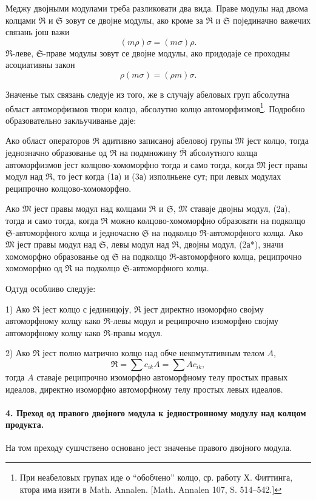 ﻿\documentclass[11pt]{article}
\providecommand{\frM}{\mathfrak M}
\providecommand{\frR}{\mathfrak R}
\providecommand{\frS}{\mathfrak S}
\providecommand{\glqq}{``}
\providecommand{\grqq}{''}
\begin{document}
Меджу двојными модулами треба разликовати два вида. Праве модулы над двома колцами \(\frR\) и \(\frS\) зовут се двојне модулы, ако кроме за \(\frR\) и \(\frS\) појединачно важечих связань још важи
\[
        (m\rho)\sigma=(m\sigma)\rho .
\]
\(\frR\)-леве, \(\frS\)-праве модулы зовут се двојне модулы, ако придодаје се проходны асоциативны закон
\[
        \rho(m\sigma)=(\rho m)\sigma .
\]

Значенье тых связань следује из того, же в случају абеловых груп абсолутна област автоморфизмов твори колцо, абсолутно колцо автоморфизмов\footnote{При неабеловых групах иде о \glqq{}обобчено\grqq{} колцо, ср. работу Х. Фиттинга, ктора има изити в Math. Annalen. [Math. Annalen 107, S. 514--542.]}. Подробно образовательно закльучиванье даје:

Ако област операторов \(\frR\) адитивно записаној абеловој групы \(\frM\) јест колцо, тогда једнозначно образованье од \(\frR\) на подмножину \(\overline{\frR}\) абсолутного колца автоморфизмов јест колцово-хомоморфно тогда и само тогда, когда \(\frM\) јест правы модул над \(\frR\), то јест когда (1а) и (3а) изполньене сут; при левых модулах реципрочно колцово-хомоморфно.

Ако \(\frM\) јест правы модул над колцами \(\frR\) и \(\frS\), \(\frM\) ставаје двојны модул, (2а), тогда и само тогда, когда \(\frR\) можно колцово-хомоморфно образовати на подколцо \(\frS\)-автоморфного колца и једночасно \(\frS\) на подколцо \(\frR\)-автоморфного колца. Ако \(\frM\) јест правы модул над \(\frS\), левы модул над \(\frR\), двојны модул, (2а*), значи хомоморфно образованье од \(\frS\) на подколцо \(\frR\)-автоморфного колца, реципрочно хомоморфно од \(\frR\) на подколцо \(\frS\)-автоморфного колца.

Одтуд особливо следује:

1) Ако \(\frR\) јест колцо с јединицоју, \(\frR\) јест директно изоморфно својму автоморфному колцу како \(\frR\)-левы модул и реципрочно изоморфно својму автоморфному колцу како \(\frR\)-правы модул.

2) Ако \(\frR\) јест полно матрично колцо над обче некомутативным телом \(A\),
\[
        \frR=\sum c_{ik}A=\sum A c_{ik},
\]
тогда \(A\) ставаје реципрочно изоморфно автоморфному телу простых правых идеалов, директно изоморфно автоморфному телу простых левых идеалов.

\paragraph{4. Преход од правого двојного модула к једностронному модулу над колцом продукта.}
На том преходу сушчствено основано јест значенье правого двојного модула.
\end{document}
